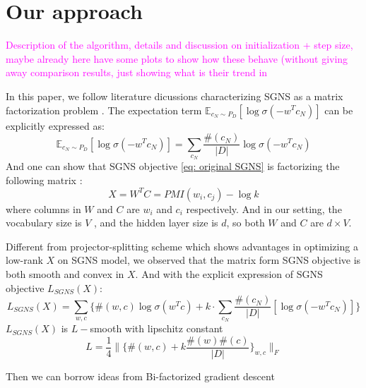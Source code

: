 \documentclass[letterpaper]{article} %
\begin{document}
\section{Our approach}
\textcolor{magenta}{Description of the algorithm, details and discussion on initialization + step size, maybe already here have some plots to show how these behave (without giving away comparison results, just showing what is their trend in}

In this paper, we follow literature dicussions characterizing SGNS as a matrix factorization problem \cite{levy2014neural}\cite{levy2015improving}. The expectation term $\mathbb{E}_{c_N\sim P_D}[\log \sigma(-w^Tc_N)]$ can be explicitly expressed as:
\begin{equation}
	\mathbb{E}_{c_N\sim P_D}[\log \sigma(-w^Tc_N)]=\sum_{c_N}\frac{\#(c_N)}{|D|}\log{\sigma(-w^Tc_N)}
\end{equation}
And one can show that SGNS objective \ref{eq: original SGNS} is factorizing the following matrix \cite{levy2014neural}:
\begin{equation}
	X=W^TC= PMI(w_i, c_j)-\log k \label{eq: SPPMI}
\end{equation}
where columns in $W$ and $C$ are $w_i$ and $c_i$ respectively. And in our setting, the vocabulary size is $V$ , and the hidden layer size is $d$, so both $W$ and $C$ are $d\times V$.

Different from projector-splitting scheme\cite{fonarev2017riemannian} which shows advantages in optimizing a low-rank $X$ on SGNS model, we observed that the matrix form SGNS objective is both smooth and convex in $X$. And with the explicit expression of SGNS objective $L_{SGNS}(X)$:
\begin{equation}
	L_{SGNS}(X)=\sum_{w,c}\{\#(w,c)\log\sigma(w^Tc)+k\cdot\sum_{c_N}\frac{\#(c_N)}{|D|}[\log \sigma(-w^Tc_N)]\}
\end{equation}
$L_{SGNS}(X)$ is $L-$smooth with lipschitz constant $$L=\frac{1}{4}\|\{\#(w,c)+k\frac{\#(w)\#(c)}{|D|}\}_{w,c}\|_F$$



Then we can borrow ideas from Bi-factorized gradient descent  \cite{park2016finding}
\end{document}
